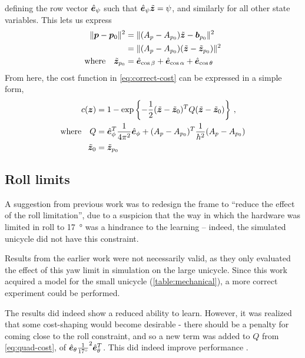 \documentclass[main.tex]{subfiles}
\begin{document}
	defining the row vector $\hat{\bm{e}}_{\psi}$ such that $\hat{\bm{e}}_{\psi}\tilde{\bm{z}} = \psi$, and similarly for all other state variables.
	This lets us express
	\begin{align}
		\|\bm{p} - \bm{p}_0\|^2
			&= \|(A_p - A_{p_0})\tilde{\bm{z}} - \bm{b}_{p_0}\|^2  \nonumber \\
			&= \|(A_p - A_{p_0})(\tilde{\bm{z}} - \tilde{\bm{z}}_{p_0})\|^2 \\
		\text{where}\quad\tilde{\bm{z}}_{p_0}
			&= \hat{\bm{e}}_{\cos \beta} + \hat{\bm{e}}_{\cos \alpha} + \hat{\bm{e}}_{\cos \theta}  \nonumber
	\end{align}
	From here, the cost function in \cref{eq:correct-cost} can be expressed in a simple form,
	\begin{align}
		c(\bm z) &= 1 - \exp\left\{-\frac{1}{2}
			(\tilde{\bm{z}} - \tilde{\bm{z}}_0)^T  Q (\tilde{\bm{z}} - \tilde{\bm{z}}_0)
		\right\} \,, \label{eq:quad-cost} \\
		\text{where}\quad Q &=
			\hat{\bm{e}}_{\phi}^T\frac{1}{4\pi^2}\hat{\bm{e}}_{\phi} +
			(A_p - A_{p_0})^T\frac{1}{h^2}(A_p - A_{p_0}) \nonumber \\
			\tilde{\bm{z}}_0 &= \tilde{\bm{z}}_{p_0} \nonumber
	\end{align}

\subsection{Roll limits}
	A suggestion from previous work was to redesign the frame to \enquote{reduce the effect of the roll limitation}\cite[p.~35]{aleksi}, due to a suspicion that the way in which the hardware was limited in roll to \SI{17}{\degree} was a hindrance to the learning -- indeed, the simulated unicycle did not have this constraint.

	Results from the earlier work were not necessarily valid, as they only evaluated the effect of this yaw limit in simulation on the large unicycle.
	Since this work acquired a model for the small unicycle (\cref{table:mechanical}), a more correct experiment could be performed.

	The results did indeed show a reduced ability to learn. 
	However, it was realized that some cost-shaping would become desirable - there should be a penalty for coming close to the roll constraint, and so a new term was added to $Q$ from \cref{eq:quad-cost}, of $\hat{\bm{e}}_{\theta}\frac{1}{\SI{17}{\degree}}^2\hat{\bm{e}}_{\theta}^T$.
	This did indeed improve performance .
\end{document}

